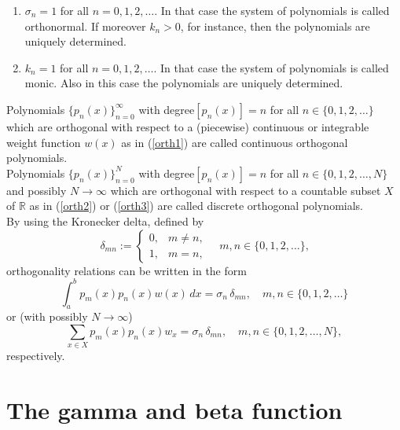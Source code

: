 \documentclass[envcountchap,graybox]{svmono}
\begin{document}
\begin{enumerate}\itemsep2.5mm
\item $\sigma_n=1$ for all $n=0,1,2,\ldots$. In that case the system of polynomials is called
orthonormal. If moreover $k_n>0$, for instance, then the polynomials are uniquely determined.
\item $k_n=1$ for all $n=0,1,2,\ldots$. In that case the system of polynomials is called
monic. Also in this case the polynomials are uniquely determined.
\end{enumerate}
Polynomials $\{p_n(x)\}_{n=0}^{\infty}$ with degree$[p_n(x)]=n$ for all $n\in\{0,1,2,\ldots\}$
which are orthogonal with respect to a (piecewise) continuous or integrable weight function
$w(x)$ as in (\ref{orth1}) are called continuous orthogonal polynomials.\\
Polynomials $\{p_n(x)\}_{n=0}^N$ with degree$[p_n(x)]=n$ for all $n\in\{0,1,2,\ldots,N\}$ and
possibly $N\rightarrow\infty$ which are orthogonal with respect to a countable subset $X$ of
$\mathbb{R}$ as in (\ref{orth2}) or (\ref{orth3}) are called discrete orthogonal polynomials.\\
By using the Kronecker delta, defined by
\begin{equation}
\label{Kronecker}
\,\delta_{mn}:=\left\{\begin{array}{ll}0, &m\neq n,\\[5mm]
1, & m=n,\end{array}\right.\quad m,n\in\{0,1,2,\ldots\},
\end{equation}
orthogonality relations can be written in the form
\begin{equation}
\label{orth4}
\int_a^bp_m(x)p_n(x)w(x)\,dx=\sigma_n\,\delta_{mn},\quad m,n\in\{0,1,2,\ldots\}
\end{equation}
or (with possibly $N\rightarrow\infty$)
\begin{equation}
\label{orth5}
\sum_{x\in X}p_m(x)p_n(x)w_x=\sigma_n\,\delta_{mn},\quad m,n\in\{0,1,2,\ldots,N\},
\end{equation}
respectively.

\section{The gamma and beta function}
\par\setcounter{equation}{0}
\label{gamma function}
\end{document}
